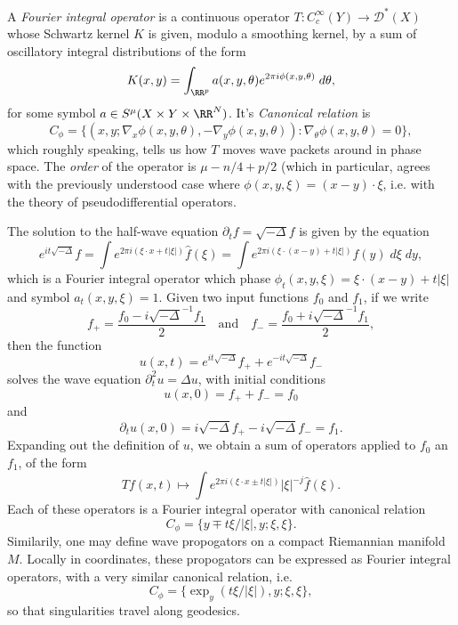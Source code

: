 A \emph{Fourier integral operator} is a continuous operator $T: C_c^\infty(Y) \to \mathcal{D}^*(X)$ whose Schwartz kernel $K$ is given, modulo a smoothing kernel, by a sum of oscillatory integral distributions of the form
%
\[ K(x,y) = \int_{\RR^p} a(x,y,\theta) e^{2 \pi i \phi(x,y,\theta)}\; d\theta, \]
%
for some symbol $a \in S^\mu(X \times Y \times \RR^N)$. It's \emph{Canonical relation} is
%
\[ C_\phi = \{ (x,y; \nabla_x \phi(x,y,\theta), - \nabla_y \phi(x,y,\theta) ) : \nabla_\theta \phi(x,y,\theta) = 0 \}, \]
%
which roughly speaking, tells us how $T$ moves wave packets around in phase space. The \emph{order} of the operator is $\mu - n/4 + p/2$ (which in particular, agrees with the previously understood case where $\phi(x,y,\xi) = (x - y) \cdot \xi$, i.e. with the theory of pseudodifferential operators.

\begin{example}
    The solution to the half-wave equation $\partial_t f = \sqrt{-\Delta} f$ is given by the equation
    \[ e^{i t \sqrt{-\Delta}} f = \int e^{2 \pi i (\xi \cdot x + t |\xi|)} \widehat{f}(\xi) = \int e^{2 \pi i (\xi \cdot (x - y) + t |\xi|)} f(y)\; d\xi\; dy, \]
    which is a Fourier integral operator which phase $\phi_t(x,y,\xi) = \xi \cdot (x - y) + t |\xi|$ and symbol $a_t(x,y,\xi) = 1$. Given two input functions $f_0$ and $f_1$, if we write
    \[ f_+ = \frac{f_0 - i \sqrt{-\Delta}^{-1} f_1}{2}  \quad\text{and}\quad   f_- = \frac{f_0 + i \sqrt{-\Delta}^{-1} f_1}{2}, \]
    then the function
    \[ u(x,t) = e^{it \sqrt{-\Delta}} f_+ + e^{-i t \sqrt{-\Delta}} f_- \]
    solves the wave equation $\partial_t^2 u = \Delta u$, with initial conditions
    \[ u(x,0) = f_+ + f_- = f_0 \]
    and
    \[ \partial_t u(x,0) = i \sqrt{-\Delta} f_+ - i \sqrt{-\Delta} f_- = f_1. \]
    Expanding out the definition of $u$, we obtain a sum of operators applied to $f_0$ an $f_1$, of the form
    \[ Tf(x,t) \mapsto \int e^{2 \pi i (\xi \cdot x \pm t |\xi|)} |\xi|^{-j} \widehat{f}(\xi). \]
    Each of these operators is a Fourier integral operator with canonical relation
    \[ C_\phi = \{ y \mp t \xi / |\xi|, y; \xi, \xi \}. \]
    Similarily, one may define wave propogators on a compact Riemannian manifold $M$. Locally in coordinates, these propogators can be expressed as Fourier integral operators, with a very similar canonical relation, i.e.
    \[ C_\phi = \{ \exp_y(t \xi / |\xi|), y; \xi, \xi \}, \]
    so that singularities travel along geodesics.
\end{example}

